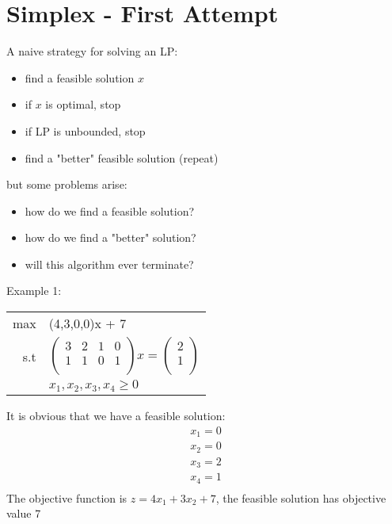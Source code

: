 \documentclass[letterpaper, 12pt]{article}
\begin{document}
    \section{Simplex - First Attempt}
    A naive strategy for solving an LP:
    \begin{itemize}
        \item find a feasible solution $x$
        \item if $x$ is optimal, stop
        \item if LP is unbounded, stop
        \item find a "better" feasible solution (repeat)
    \end{itemize}
    but some problems arise:
    \begin{itemize}
        \item how do we find a feasible solution?
        \item how do we find a "better" solution?
        \item will this algorithm ever terminate?
    \end{itemize}
    \bigskip
    Example 1:\\
    \begin{center}
        \begin{tabular}{rl}
            max & (4,3,0,0)x + 7\\
            s.t & $\begin{pmatrix}
                3 & 2 & 1 & 0\\
                1 & 1 & 0 & 1\\
            \end{pmatrix} x = \begin{pmatrix}
                2\\
                1\\
            \end{pmatrix}$\\
            & $x_1,x_2,x_3,x_4 \geq 0$\\
        \end{tabular}
    \end{center}
    It is obvious that we have a feasible solution:\\
    \begin{align*}
        x_1 = 0\\
        x_2 = 0\\
        x_3 = 2\\
        x_4 = 1\\
    \end{align*}
    The objective function is $z = 4x_1 + 3x_2 + 7$, the feasible solution has objective value 7\\
\end{document}
